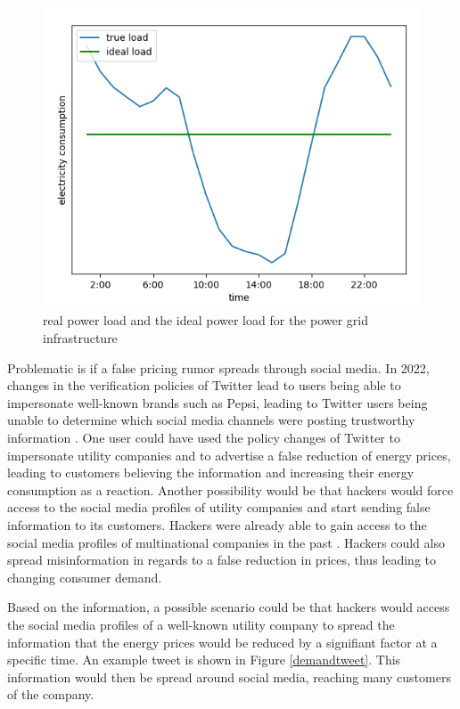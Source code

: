 \begin{figure}[!ht]
    \center
    \includegraphics[scale=.75]{figs/duckcurve.png}
    \caption{real power load and the ideal power load for the 
    power grid infrastructure}
    \label{duckcurve}
\end{figure}

Problematic is if a false pricing rumor spreads through social media.
In 2022, changes in the verification policies of Twitter lead to users being able 
to impersonate well-known brands such as Pepsi, leading to Twitter 
users being unable to determine which social media channels were
posting trustworthy information \cite{twitterchaos}. One user could
have used the policy changes of Twitter to impersonate 	utility companies
and to advertise a false reduction of energy prices, leading to customers
believing the information and increasing their energy consumption as a 
reaction. Another possibility would be that hackers would force access to the
social media profiles of utility companies and start sending false 
information to its customers. Hackers were already able to gain access
to the social media profiles of multinational companies in the past
\cite{twitterhacker}. Hackers could also spread misinformation in regards
to a false reduction in prices, thus leading to changing consumer demand.

Based on the information, a possible scenario could be that hackers would
access the social media profiles of a well-known utility company
to spread the information that the energy prices would be reduced by 
a signifiant factor at a specific time. An example tweet is shown in 
Figure \ref{demandtweet}. This information would then be 
spread around social media, reaching many customers of the company.

